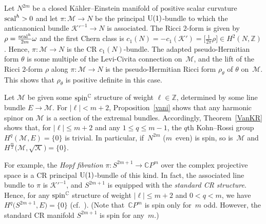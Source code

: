 \documentclass[pdftex]{sigma}
\numberwithin{equation}{section}
\newcommand{\ZZ}{\mathbb{Z}}
\newcommand{\CC}{\mathbb{C}}
\begin{document}
\begin{Example}
Let $N^{2m}$ be a closed K\"ahler--Einstein manifold of positive scalar curvature ${\rm scal}^h>0$ and let
$\pi\colon \mathcal{M}\to N$ be the principal ${\rm U}(1)$-bundle to which the anticanonical bundle $\mathcal{K}'^{-1}\to N$ is associated.
The Ricci $2$-form is given by $\rho=\frac{{\rm scal}^h}{2m}\omega$ and the first Chern class is
$c_1(N)=-c_1(\mathcal{K}')=\big[\frac{1}{2\pi}\rho\big]\in H^2(N,\ZZ)$. Hence, $\pi\colon \mathcal{M}\to N$ is the
CR $c_1(N)$-bundle. The adapted pseudo-Hermitian form $\theta$ is some multiple of the Levi-Civita connection on~$\mathcal{M}$, and
the lift of the Ricci $2$-form $\rho$ along $\pi\colon \mathcal{M}\to N$ is the pseudo-Hermitian Ricci form $\rho_\theta$ of $\theta$ on~$\mathcal{M}$. This shows that $\rho_\theta$ is positive definite in this case.

Let $\mathcal{M}$ be given some ${\rm spin}^\CC$ structure of weight $\ell\in\ZZ$, determined by some line bundle $E\to \mathcal{M}$.
For $|\ell|<m+2$, Proposition~\ref{vani} shows that any harmonic spinor on $\mathcal{M}$ is a section of the extremal bundles.
Accordingly, Theorem~\ref{VanKR} shows that, for $|\ell|\leq m+2$ and any $1\leq q\leq m-1$, the $q$th Kohn--Rossi group
$H^q(\mathcal{M},E)=\{0\}$ is trivial. In particular, if~$N^{2m}$ ($m$~even) is spin, so is~$\mathcal{M}$ and
$H^{\frac{m}{2}}\big(\mathcal{M},\sqrt{\mathcal{K}}\big)=\{0\}$.

For example, the {\em Hopf fibration} $\pi\colon S^{2m+1}\to \CC P^{m}$ over the complex projective space is a CR principal ${\rm U}(1)$-bundle of this
kind. In fact, the associated line bundle to $\pi$ is $\mathcal{K}'^{-1}$, and $S^{2m+1}$ is equipped with the {\em standard CR structure}.
Hence, for any ${\rm spin}^\CC$ structure of weight $|\ell|\leq
m+2$ and $0<q<m$,
we have $H^q\big(S^{2m+1},E\big)=\{0\}$ (cf.~\cite{Tan}). (Note that~$\CC P^{m}$ is spin only for~$m$ odd. However, the standard CR manifold $S^{2m+1}$ is spin for any~$m$.)
\end{Example}
\end{document}
